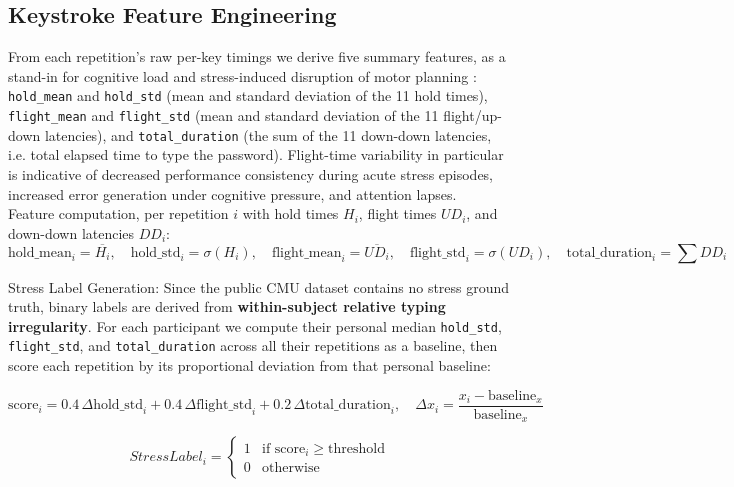 \documentclass[fleqn,10pt]{wlscirep}
\begin{document}
\subsection*{Keystroke Feature Engineering}
From each repetition's raw per-key timings we derive five summary features, as a stand-in for cognitive load and stress-induced disruption of motor planning \cite{26sloane2024staying}: \texttt{hold\_mean} and \texttt{hold\_std} (mean and standard deviation of the 11 hold times), \texttt{flight\_mean} and \texttt{flight\_std} (mean and standard deviation of the 11 flight/up-down latencies), and \texttt{total\_duration} (the sum of the 11 down-down latencies, i.e. total elapsed time to type the password). Flight-time variability in particular is indicative of decreased performance consistency during acute stress episodes, increased error generation under cognitive pressure, and attention lapses.\\
Feature computation, per repetition $i$ with hold times $H_i$, flight times $UD_i$, and down-down latencies $DD_i$:
\begin{equation}
\text{hold\_mean}_i = \overline{H_i}, \quad \text{hold\_std}_i = \sigma(H_i), \quad \text{flight\_mean}_i = \overline{UD_i}, \quad \text{flight\_std}_i = \sigma(UD_i), \quad \text{total\_duration}_i = \sum DD_i
\end{equation}

Stress Label Generation: Since the public CMU dataset contains no stress ground truth, binary labels are derived from \textbf{within-subject relative typing irregularity}. For each participant we compute their personal median \texttt{hold\_std}, \texttt{flight\_std}, and \texttt{total\_duration} across all their repetitions as a baseline, then score each repetition by its proportional deviation from that personal baseline:

\begin{equation}
\text{score}_i = 0.4\,\Delta\text{hold\_std}_i + 0.4\,\Delta\text{flight\_std}_i + 0.2\,\Delta\text{total\_duration}_i, \quad \Delta x_i = \frac{x_i - \text{baseline}_x}{\text{baseline}_x}
\end{equation}

\begin{equation}
Stress Label_i = \begin{cases}
1 & \text{if score}_i \geq \text{threshold} \\
0 & \text{otherwise}
\end{cases}
\end{equation}
\end{document}
